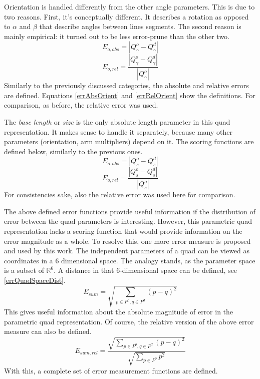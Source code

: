Orientation is handled differently from the other angle parameters.
This is due to two reasons.
First, it's conceptually different.
It describes a rotation as opposed to $\alpha$ and $\beta$ that describe angles between lines segments.
The second reason is mainly empirical: it turned out to be less error-prune than the other two.
\begin{equation}
	E_{o,abs} = |Q_\gamma^o - Q_\gamma^d|
	\label{eq:errAbsOrient}
\end{equation}
\begin{equation}
	E_{o,rel} = \frac{|Q_\gamma^o - Q_\gamma^d|}{|Q_\gamma^o|}
	\label{eq:errRelOrient}
\end{equation}
Similarly to the previously discussed categories, the absolute and relative errors are defined.
Equations \eqref{errAbsOrient} and \eqref{errRelOrient} show the definitions.
For comparison, as before, the relative error was used.

The \textit{base length} or \textit{size} is the only absolute length parameter in this quad representation.
It makes sense to handle it separately, because many other parameters (orientation, arm multipliers) depend on it.
The scoring functions are defined below, similarly to the previous ones.
\begin{equation}
	E_{o,abs} = |Q_s^o - Q_s^d|
	\label{eq:errAbsSize}
\end{equation}
\begin{equation}
	E_{o,rel} = \frac{|Q_s^o - Q_s^d|}{|Q_s^o|}
	\label{eq:errRelSize}
\end{equation}
For consistencies sake, also the relative error was used here for comparison.

The above defined error functions provide useful information if the distribution of error between the quad parameters is interesting.
However, this parametric quad representation lacks a scoring function that would provide information on the error magnitude as a whole.
To resolve this, one more error measure is proposed and used by this work.
The independent parameters of a quad can be viewed as coordinates in a 6 dimensional space.
The analogy stands, as the parameter space is a subset of $\mathbb{R}^6$.
A distance in that 6-dimensional space can be defined, see \eqref{errQuadSpaceDist}.
\begin{equation}
	E_{sum} = \sqrt{\sum_{p \in P^o, q \in P^d} (p - q)^2}
	\label{eq:errQuadSpaceDist}
\end{equation}
This gives useful information about the absolute magnitude of error in the parametric quad representation.
Of course, the relative version of the above error measure can also be defined.
\begin{equation}
E_{sum, rel} = \frac{\sqrt{\sum_{p \in P^o, q \in P^d} (p - q)^2}}{\sqrt{\sum_{p \in P^o} p^2}}
\label{eq:errQuadSpaceDistRel}
\end{equation}
With this, a complete set of error measurement functions are defined.

